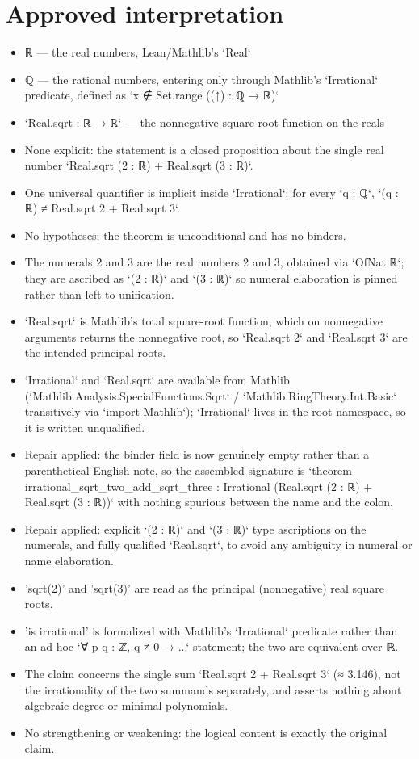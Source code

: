 \documentclass[11pt]{article}
\begin{document}
\section*{Approved interpretation}
\begin{itemize}
\item ℝ — the real numbers, Lean/Mathlib's `Real`
\item ℚ — the rational numbers, entering only through Mathlib's `Irrational` predicate, defined as `x ∉ Set.range ((↑) : ℚ → ℝ)`
\item `Real.sqrt : ℝ → ℝ` — the nonnegative square root function on the reals
\item None explicit: the statement is a closed proposition about the single real number `Real.sqrt (2 : ℝ) + Real.sqrt (3 : ℝ)`.
\item One universal quantifier is implicit inside `Irrational`: for every `q : ℚ`, `(q : ℝ) ≠ Real.sqrt 2 + Real.sqrt 3`.
\item No hypotheses; the theorem is unconditional and has no binders.
\item The numerals 2 and 3 are the real numbers 2 and 3, obtained via `OfNat ℝ`; they are ascribed as `(2 : ℝ)` and `(3 : ℝ)` so numeral elaboration is pinned rather than left to unification.
\item `Real.sqrt` is Mathlib's total square-root function, which on nonnegative arguments returns the nonnegative root, so `Real.sqrt 2` and `Real.sqrt 3` are the intended principal roots.
\item `Irrational` and `Real.sqrt` are available from Mathlib (`Mathlib.Analysis.SpecialFunctions.Sqrt` / `Mathlib.RingTheory.Int.Basic` transitively via `import Mathlib`); `Irrational` lives in the root namespace, so it is written unqualified.
\item Repair applied: the binder field is now genuinely empty rather than a parenthetical English note, so the assembled signature is `theorem irrational\_sqrt\_two\_add\_sqrt\_three : Irrational (Real.sqrt (2 : ℝ) + Real.sqrt (3 : ℝ))` with nothing spurious between the name and the colon.
\item Repair applied: explicit `(2 : ℝ)` and `(3 : ℝ)` type ascriptions on the numerals, and fully qualified `Real.sqrt`, to avoid any ambiguity in numeral or name elaboration.
\item 'sqrt(2)' and 'sqrt(3)' are read as the principal (nonnegative) real square roots.
\item 'is irrational' is formalized with Mathlib's `Irrational` predicate rather than an ad hoc `∀ p q : ℤ, q ≠ 0 → ...` statement; the two are equivalent over ℝ.
\item The claim concerns the single sum `Real.sqrt 2 + Real.sqrt 3` (≈ 3.146), not the irrationality of the two summands separately, and asserts nothing about algebraic degree or minimal polynomials.
\item No strengthening or weakening: the logical content is exactly the original claim.
\end{itemize}
\end{document}

